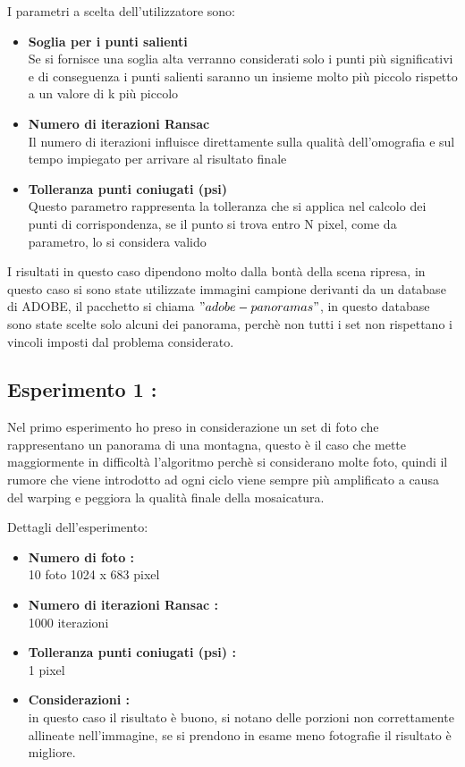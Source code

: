 \documentclass[11pt, oneside]{article}   	%
\begin{document}
I parametri a scelta dell'utilizzatore sono:
\begin{itemize}
	\item \textbf{Soglia per i punti salienti} \\
	Se si fornisce una soglia alta verranno considerati solo i punti più significativi e di conseguenza i punti salienti saranno un insieme molto più piccolo rispetto a un valore di k più piccolo
	\item \textbf{Numero di iterazioni Ransac} \\
	Il numero di iterazioni influisce direttamente sulla qualità dell'omografia e sul tempo  impiegato per arrivare al risultato finale
	\item \textbf{Tolleranza punti coniugati (psi)}\\
        Questo parametro rappresenta la tolleranza che si applica nel calcolo dei punti di corrispondenza, se il punto si trova entro N pixel, come da parametro, lo si considera valido
\end{itemize}

I risultati in questo caso dipendono molto dalla bontà della scena ripresa, in questo caso si sono state utilizzate immagini campione derivanti da un database di ADOBE, il pacchetto si chiama $"adobe-panoramas"$, in questo database sono state scelte solo alcuni dei panorama, perchè non tutti i set non rispettano i vincoli imposti dal problema considerato.


\subsection{Esperimento 1 :}



Nel primo esperimento ho preso in considerazione un set di foto che rappresentano un panorama di una montagna, questo è il caso che mette maggiormente in difficoltà l'algoritmo perchè si considerano molte foto, quindi il rumore che viene introdotto ad ogni ciclo viene sempre più amplificato a causa del warping e peggiora la qualità finale della mosaicatura.

Dettagli dell'esperimento:
\begin{itemize}
	\item \textbf{Numero di foto :} \\
	10 foto 1024 x 683 pixel
	\item \textbf{Numero di iterazioni Ransac : } \\
	1000 iterazioni
	\item \textbf{Tolleranza punti coniugati (psi) :}\\
        1 pixel 
        \item \textbf{Considerazioni : }\\
        in questo caso il risultato è buono, si notano delle porzioni non correttamente allineate nell'immagine, se si prendono in esame meno fotografie il risultato è migliore.
        
\end{itemize}
\end{document}
